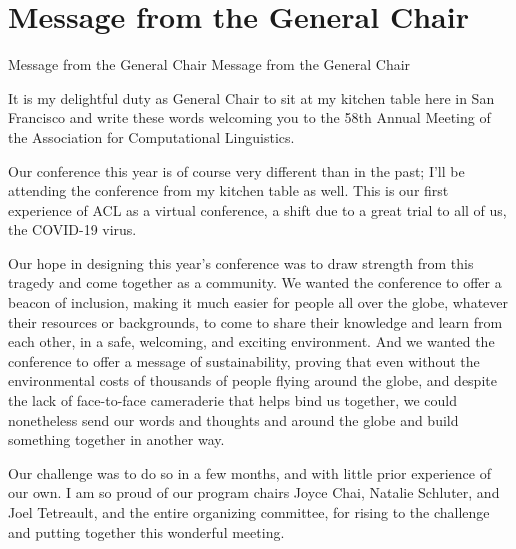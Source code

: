 \section{Message from the General Chair}\vspace{2em}
\setheaders%
    {Message from the General Chair}%
    {Message from the General Chair}
\thispagestyle{emptyheader}

\setlength{\parskip}{.7ex}

It is my delightful duty as General Chair to sit at 
my kitchen table here in San Francisco and write these words welcoming you to the 58th
Annual Meeting of the Association for Computational Linguistics.

Our conference this year is of course very different than in the past;
I'll be attending the conference from my kitchen table as well.
This is our first experience of ACL as a virtual conference, a 
shift due to a great trial to all of us, the COVID-19 virus.

Our hope in designing this year's conference was to draw strength from this tragedy and come together
as a community. We wanted the conference to offer a beacon of inclusion,
making it much easier for people all over the globe, whatever
their resources or backgrounds, to come to share their knowledge
and learn from each other, in a safe, welcoming, and exciting environment.
And we wanted the conference to offer a message of sustainability,
proving that even without the environmental costs of thousands of people flying around the globe,
and despite the lack of face-to-face cameraderie that helps bind us together,
we could nonetheless send our words and thoughts and
around the globe and build something together in another way.

Our challenge was to do so in a few months, and with little prior experience of our own.
I am so proud of our program chairs Joyce Chai, Natalie Schluter, and Joel Tetreault,
and the entire organizing committee, for rising to the challenge and putting together this wonderful meeting.

